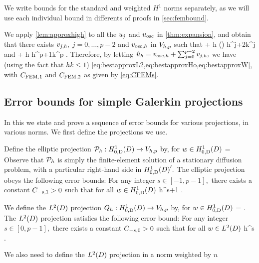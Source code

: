 We write bounds for the standard and weighted $H^1$ norms separately, as we will use each individual bound in differents of proofs in \cref{sec:fembound}.

We apply \cref{lem:approxhigh} to all the $u_{j}$ and $u_{\mathrm{osc}}$ in \cref{thm:expansion}, and obtain that there exists $v_{j,h},$ $j=0,\ldots,p-2$ and $v_{\mathrm{osc},h}$ in $V_{h,p}$ such that 
\beqs
\NLtD{\usj - \vjh} + h\NHoD{\usj - \vjh} \leq {} \Pj\mleft(\mright) h^{j+2}k^j \Cfg
\eeqs
and
\beqs
\NLtD{\uosc - \vosch} + h\NHoD{\uosc - \vosch} \leq {} \Cosc\CAnk h^{p+1}k^p \Cfg.
\eeqs
Therefore, by letting $\hat{u}_{h} = v_{\mathrm{osc},h} + \sum_{j=0}^{p-2} v_{j,h},$ we have (using the fact that $hk \leq 1$) \cref{eq:bestapproxL2,eq:bestapproxHo,eq:bestapproxW}, with $C_{\mathrm{FEM},1}$ and $C_{\mathrm{FEM},2}$ as given by \cref{eq:CFEMs}.
\epf

\subsection{Error bounds for simple Galerkin projections}\label{sec:errgalerkin}
In this  we state and prove a sequence of error bounds for various projections, in various norms. We first define the projections we use.

Define the elliptic projection $\Ph:\HozDD\rightarrow\Vhp$ by, for $w \in \HozDD$
\beqs
{} =  \tforall \vh \in \Vhp
\eeqs
Observe that $\mathcal P_{h}$ is simply the finite-element solution of a stationary diffusion problem, with a particular right-hand side in $\HozDD'.$
The elliptic projection obeys the following error bounds:
\label{lem:ellprojerr}
For any integer $s \in [-1,p-1],$ there exists a constant $C_{-s,1} >0$ such that for all $w \in \HozDD$
\beq\label{eq:ellprojerr}
 \leq \Cmso h^{s+1} .
\eeq
\ele{}

We define the $\LtD$ projection $\Qh:\HozDD\rightarrow \Vhp$ by, for $w \in \HozDD$
\beqs
{} =  \tforall \vh \in \Vhp.
\eeqs
The $\LtD$ projection satisfies the following error bound:
\label{lem:ltdprojerr}
For any integer $s \in [0,p-1],$ there exists a constant $C_{-s,0} >0$ such that for all $w \in \LtD$
\beqs
{} \leq \Cmsz h^{s} .
\eeqs
\ele{}

We also need to define the $\LtD$ projection in a norm weighted by $n$

